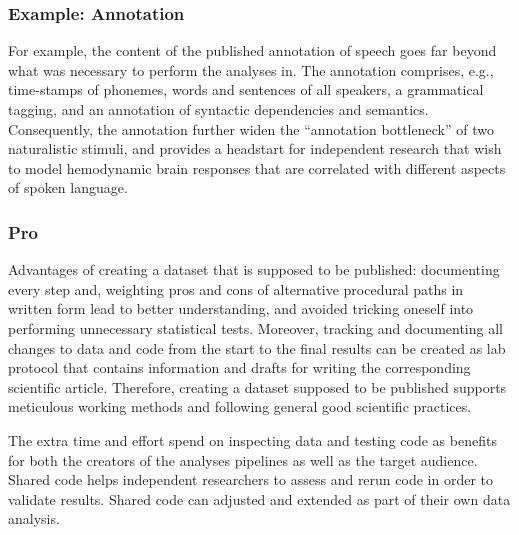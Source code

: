 \subsubsection{Example: Annotation}

For example, the content of the published annotation of speech
\citep{haeusler2021speechanno} goes far beyond what was necessary to perform the
analyses in\citep{haeusler2022processing}.
%
The annotation comprises, e.g., time-stamps of phonemes, words and sentences of
all speakers, a grammatical tagging, and an annotation of syntactic dependencies
and semantics.
%
Consequently, the annotation further widen the ``annotation bottleneck''
\citep{aliko2020naturalistic} of two naturalistic stimuli, and provides a
headstart for independent research that wish to model hemodynamic brain
responses that are correlated with different aspects of spoken language.



\subsubsection{Pro}




Advantages of creating a dataset that is supposed to be published:
%
documenting every step and, weighting pros and cons of alternative procedural
paths in written form lead to better understanding, and avoided tricking oneself
into performing unnecessary statistical tests.
%
Moreover, tracking and documenting all changes to data and code from the start
to the final results can be created as lab protocol that contains information
and drafts for writing the corresponding scientific article.
%
Therefore, creating a dataset supposed to be published supports meticulous
working methods and following general good scientific practices.

The extra time and effort spend on inspecting data and testing code as benefits
for both the creators of the analyses pipelines as well as the target audience.
%
Shared code helps independent researchers to assess and rerun code in order to
validate results.
%
Shared code can adjusted and extended  as part of their own data analysis.

